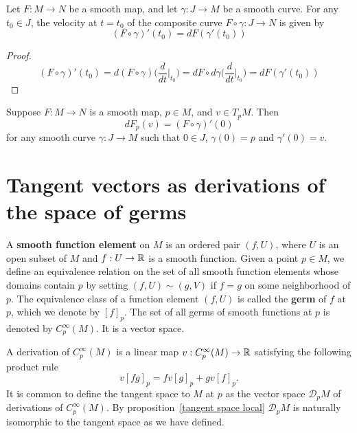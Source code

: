 \begin{proposition}\label{diff composite curve}
Let $F:M\to N$ be a smooth map, and let $\gamma:J\to M$ be a smooth curve. For any $t_0\in J$, the velocity at $t=t_0$ of the composite curve $F\circ\gamma:J\to N$ is given by
\[(F\circ\gamma)'(t_0)=dF(\gamma'(t_0))\]
\end{proposition}
\begin{proof}
\[(F\circ\gamma)'(t_0)=d(F\circ\gamma)\Big(\frac{d}{dt}\Big|_{t_0}\Big)=dF\circ d\gamma\Big(\frac{d}{dt}\Big|_{t_0}\Big)=dF(\gamma'(t_0))\]
\end{proof}
\begin{corollary}\label{compute diff by curve}
Suppose $F:M\to N$ is a smooth map, $p\in M$, and $v\in T_pM$. Then
\[dF_p(v)=(F\circ\gamma)'(0)\]
for any smooth curve $\gamma:J\to M$ such that $0\in J$, $\gamma(0)=p$ and $\gamma'(0)=v$.
\end{corollary}
\section{Tangent vectors as derivations of the space of germs}
A \textbf{smooth function element} on $M$ is an ordered pair $(f,U)$, where $U$ is an open subset of $M$ and $f:U\to\mathbb{R}$ is a smooth function. Given a point $p\in M$, we define an equivalence relation on the set of all smooth function elements whose domains contain $p$ by setting $(f,U)\sim (g,V)$ if $f=g$ on some neighborhood of $p$. The equivalence class of a function element $(f,U)$ is called the \textbf{germ} of $f$ at $p$, which we denote by $[f]_p$. The set of all germs of smooth functions at $p$ is denoted by $C^\infty_p(M)$. It is a vector space.\par
A derivation of $C^\infty_p(M)$ is a linear map $v:C^\infty_p(M)\to\mathbb{R}$ satisfying the following product rule
\[v[fg]_p=fv[g]_p+gv[f]_p.\]
It is common to define the tangent space to $M$ at $p$ as the vector space $\mathcal{D}_pM$ of derivations of $C^\infty_p(M)$. By proposition~\ref{tangent space local} $\mathcal{D}_pM$ is naturally isomorphic to the tangent space as we have defined.
